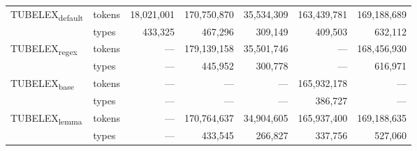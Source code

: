 \begin{tabular}{llrrrrr}
\multirow[c]{2}{*}{TUBELEX\textsubscript{default}} & tokens & 18,021,001 & 170,750,870 & 35,534,309 & 163,439,781 & 169,188,689 \\
 & \cellcolor[HTML]{EEEEEE} types & \cellcolor[HTML]{EEEEEE} 433,325 & \cellcolor[HTML]{EEEEEE} 467,296 & \cellcolor[HTML]{EEEEEE} 309,149 & \cellcolor[HTML]{EEEEEE} 409,503 & \cellcolor[HTML]{EEEEEE} 632,112 \\
\multirow[c]{2}{*}{TUBELEX\textsubscript{regex}} & tokens & {---} & 179,139,158 & 35,501,746 & {---} & 168,456,930 \\
 & \cellcolor[HTML]{EEEEEE} types & \cellcolor[HTML]{EEEEEE} {---} & \cellcolor[HTML]{EEEEEE} 445,952 & \cellcolor[HTML]{EEEEEE} 300,778 & \cellcolor[HTML]{EEEEEE} {---} & \cellcolor[HTML]{EEEEEE} 616,971 \\
\multirow[c]{2}{*}{TUBELEX\textsubscript{base}} & tokens & {---} & {---} & {---} & 165,932,178 & {---} \\
 & \cellcolor[HTML]{EEEEEE} types & \cellcolor[HTML]{EEEEEE} {---} & \cellcolor[HTML]{EEEEEE} {---} & \cellcolor[HTML]{EEEEEE} {---} & \cellcolor[HTML]{EEEEEE} 386,727 & \cellcolor[HTML]{EEEEEE} {---} \\
\multirow[c]{2}{*}{TUBELEX\textsubscript{lemma}} & tokens & {---} & 170,764,637 & 34,904,605 & 165,937,400 & 169,188,635 \\
 & \cellcolor[HTML]{EEEEEE} types & \cellcolor[HTML]{EEEEEE} {---} & \cellcolor[HTML]{EEEEEE} 433,545 & \cellcolor[HTML]{EEEEEE} 266,827 & \cellcolor[HTML]{EEEEEE} 337,756 & \cellcolor[HTML]{EEEEEE} 527,060 \\
\bottomrule
\end{tabular}

